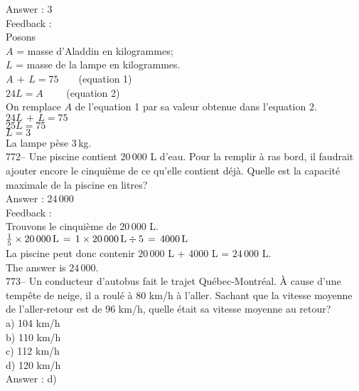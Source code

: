 \documentclass[letterpaper, 12pt]{article}
\begin{document}
Answer : 3\\

Feedback :\\
Posons\\
$A$ = masse d'Aladdin en kilogrammes; \\
$L$ = masse de la lampe en kilogrammes.\\

$A\,+\,L=75 \qquad $(equation 1)\\
$24L=A \qquad $ (equation 2)\\

On remplace $A$ de l'equation 1 par sa valeur obtenue dans l'equation
2.\\
$24L \,+\,L = 75$\\
$25L=75$\\
$L=3$\\
La lampe p\`ese 3\,kg.\\

772-- Une piscine contient $20\,000$ L d'eau.  Pour la remplir \`a ras bord,
il faudrait ajouter encore le cinqui\`eme de ce qu'elle contient d\'ej\`a.
Quelle est la capacit\'e maximale de la piscine en litres?\\

Answer : $24\,000$ \\

Feedback : \\
Trouvons le cinqui\`eme de $20\,000$ L.\\
$\frac{1}{5}\times 20\,000
\textrm{\,L}\,=\,1\times20\,000\,\textrm{L}\div5\,=\,4000\,\textrm{L}$\\
La piscine peut donc contenir $20\,000$ L + 4000 L = $24\,000$ L.\\
The answer is $24\,000$.\\

773-- Un conducteur d'autobus fait le trajet Qu\'ebec-Montr\'eal.  \`A cause
d'une temp\^ete de neige, il a roul\'e \`a 80 km/h \`a l'aller.  Sachant que
la vitesse moyenne de l'aller-retour est de 96 km/h, quelle \'etait sa
vitesse moyenne au retour?\\
a) 104 km/h\\
b) 110 km/h\\
c) 112 km/h\\
d) 120 km/h\\

Answer : d)\\
\end{document}

